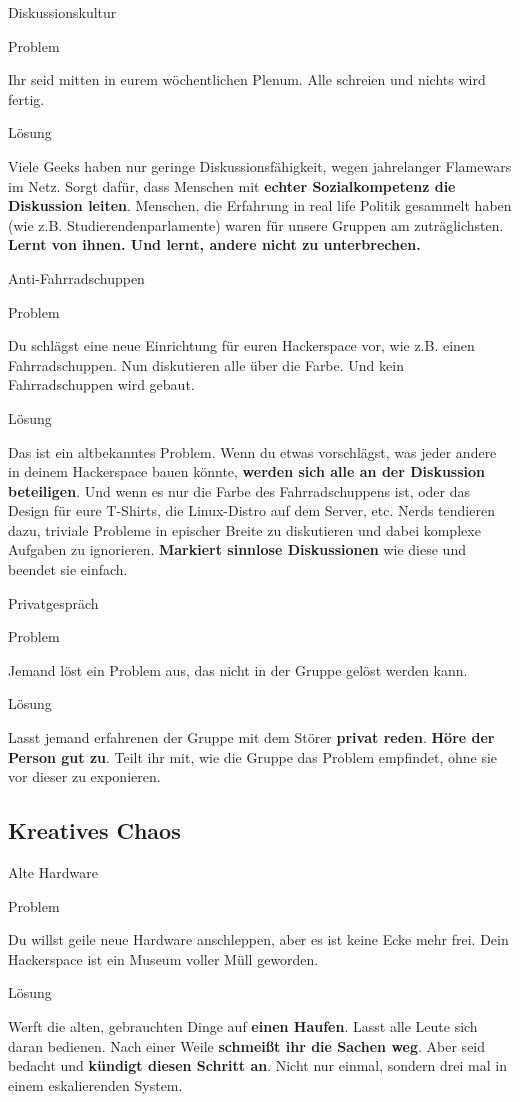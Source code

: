 \documentclass{beamer}
\newcommand{\pattern}[2]{
  \begin{alertblock}{Problem}
    #1
  \end{alertblock}
  \pause
  \begin{exampleblock}{Lösung}
    #2
  \end{exampleblock}
}
\begin{document}
  \begin{frame}{Diskussionskultur}
    \pattern{
      Ihr seid mitten in eurem wöchentlichen Plenum. Alle schreien und nichts
      wird fertig.
    }{
      Viele Geeks haben nur geringe Diskussionsfähigkeit, wegen jahrelanger Flamewars
      im Netz. Sorgt dafür, dass Menschen mit \textbf{echter Sozialkompetenz die
      Diskussion leiten}. Menschen, die Erfahrung in real life Politik gesammelt
      haben (wie z.B. Studierendenparlamente) waren für unsere Gruppen am
      zuträglichsten. \textbf{Lernt von ihnen. Und lernt, andere nicht zu
      unterbrechen.}
    }
  \end{frame}

  \begin{frame}{Anti-Fahrradschuppen}
    \pattern{
      Du schlägst eine neue Einrichtung für euren Hackerspace vor, wie z.B.
      einen Fahrradschuppen. Nun diskutieren alle über die Farbe. Und kein
      Fahrradschuppen wird gebaut.
    }{
      Das ist ein altbekanntes Problem. Wenn du etwas vorschlägst, was jeder
      andere in deinem Hackerspace bauen könnte, \textbf{werden sich alle an der
      Diskussion beteiligen}. Und wenn es nur die Farbe des Fahrradschuppens
      ist, oder das Design für eure T-Shirts, die Linux-Distro auf dem Server,
      etc. Nerds tendieren dazu, triviale Probleme in epischer Breite zu
      diskutieren und dabei komplexe Aufgaben zu ignorieren. \textbf{Markiert
      sinnlose Diskussionen} wie diese und beendet sie einfach.
    }
  \end{frame}

  \begin{frame}{Privatgespräch}
    \pattern{
      Jemand löst ein Problem aus, das nicht in der Gruppe gelöst werden kann.
    }{
      Lasst jemand erfahrenen der Gruppe mit dem Störer \textbf{privat reden}.
      \textbf{Höre der Person gut zu}. Teilt ihr mit, wie die Gruppe das Problem
      empfindet, ohne sie vor dieser zu exponieren.
    }
  \end{frame}

  \subsection{Kreatives Chaos}

  \begin{frame}{Alte Hardware}
    \pattern{
      Du willst geile neue Hardware anschleppen, aber es ist keine Ecke mehr
      frei. Dein Hackerspace ist ein Museum voller Müll geworden.
    }{
      Werft die alten, gebrauchten Dinge auf \textbf{einen Haufen}. Lasst alle
      Leute sich daran bedienen. Nach einer Weile \textbf{schmeißt ihr die
      Sachen weg}. Aber seid bedacht und \textbf{kündigt diesen Schritt an}.
      Nicht nur einmal, sondern drei mal in einem eskalierenden System.
    }
  \end{frame}
\end{document}
